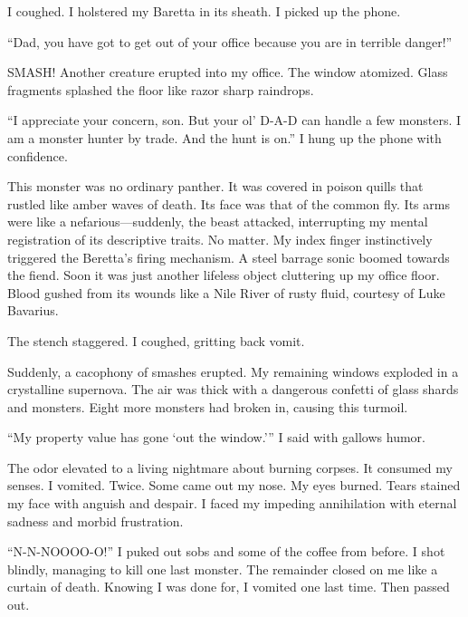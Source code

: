I coughed. I holstered my Baretta in its sheath. I picked up the
phone.

``Dad, you have got to get out of your office because you are
in terrible danger!''



SMASH! Another creature erupted into my office. The window
atomized. Glass fragments splashed the floor like razor sharp
raindrops.



``I appreciate your concern, son. But your ol' D-A-D can
handle a few monsters. I am a monster hunter by trade. And the hunt
is on.'' I hung up the phone with confidence.



This monster was no ordinary panther. It was covered in poison
quills that rustled like amber waves of death. Its face was that of
the common fly. Its arms were like a nefarious---suddenly, the
beast attacked, interrupting my mental registration of its
descriptive traits. No matter. My index finger instinctively
triggered the Beretta's firing mechanism. A steel barrage
sonic boomed towards the fiend. Soon it was just another lifeless
object cluttering up my office floor. Blood gushed from its wounds
like a Nile River of rusty fluid, courtesy of Luke Bavarius.



The stench staggered. I coughed, gritting back vomit.



Suddenly, a cacophony of smashes erupted. My remaining windows
exploded in a crystalline supernova. The air was thick with a
dangerous confetti of glass shards and monsters. Eight more
monsters had broken in, causing this turmoil.



``My property value has gone `out the
window.''' I said with gallows humor.



The odor elevated to a living nightmare about burning corpses. It
consumed my senses. I vomited. Twice. Some came out my nose. My
eyes burned. Tears stained my face with anguish and despair. I
faced my impeding annihilation with eternal sadness and morbid
frustration.



``N-N-NOOOO-O!'' I puked out sobs and some of the coffee
from before. I shot blindly, managing to kill one last monster. The
remainder closed on me like a curtain of death. Knowing I was done
for, I vomited one last time. Then passed out.



